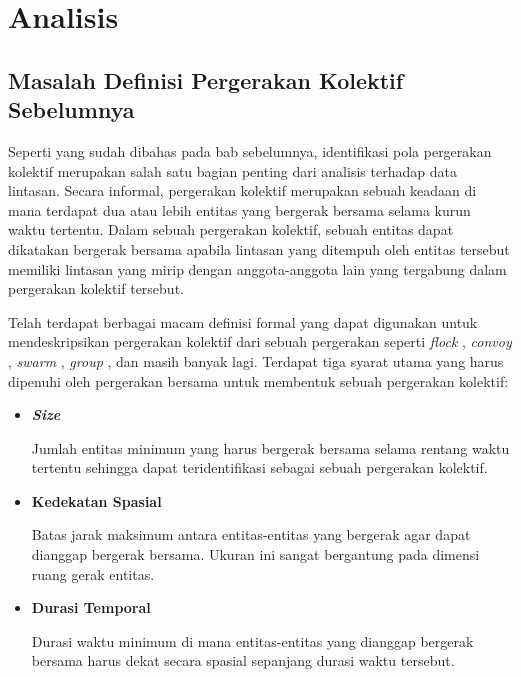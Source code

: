 \chapter{Analisis}
\label{chap:analisis}

\section{Masalah Definisi Pergerakan Kolektif Sebelumnya}
\label{sec:masalah-definisi-sebelumnya}

Seperti yang sudah dibahas pada bab sebelumnya, identifikasi pola pergerakan kolektif merupakan salah satu bagian penting dari analisis terhadap data lintasan. Secara informal, pergerakan kolektif merupakan sebuah keadaan di mana terdapat dua atau lebih entitas yang bergerak bersama selama kurun waktu tertentu. Dalam sebuah pergerakan kolektif, sebuah entitas dapat dikatakan bergerak bersama apabila lintasan yang ditempuh oleh entitas tersebut memiliki lintasan yang mirip dengan anggota-anggota lain yang tergabung dalam pergerakan kolektif tersebut.

Telah terdapat berbagai macam definisi formal yang dapat digunakan untuk mendeskripsikan pergerakan kolektif dari sebuah pergerakan seperti \textit{flock} \cite{cao:flock, gudmundsson:flock}, \textit{convoy} \cite{jeung:convoys}, \textit{swarm} \cite{li:swarm}, \textit{group} \cite{buchin:group, yida:group}, dan masih banyak lagi. Terdapat tiga syarat utama yang harus dipenuhi oleh pergerakan bersama untuk membentuk sebuah pergerakan kolektif:

\begin{itemize}
    \item \textbf{\textit{Size}}
    
    Jumlah entitas minimum yang harus bergerak bersama selama rentang waktu tertentu sehingga dapat teridentifikasi sebagai sebuah pergerakan kolektif.
    
    \item \textbf{Kedekatan Spasial}
    
    Batas jarak maksimum antara entitas-entitas yang bergerak agar dapat dianggap bergerak bersama. Ukuran ini sangat bergantung pada dimensi ruang gerak entitas.
    
    \item \textbf{Durasi Temporal}
    
    Durasi waktu minimum di mana entitas-entitas yang dianggap bergerak bersama harus dekat secara spasial sepanjang durasi waktu tersebut. 
\end{itemize}

